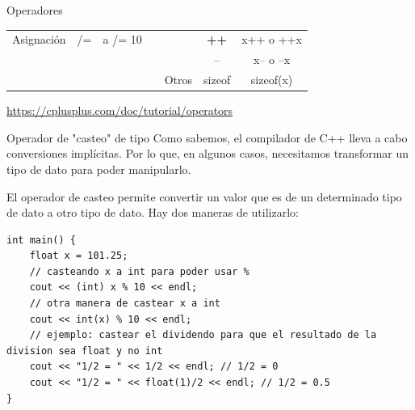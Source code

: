 \documentclass[12pt]{beamer}
\begin{document}
\begin{frame}{Operadores}
\begin{table}[]
\begin{tabular}{lccl|l|c|c|}
            \multicolumn{1}{|l|}{\multirow{-5}{*}{Asignación}} & \multicolumn{1}{c|}{/=} & \multicolumn{1}{c|}{a /= 10} &  &  & \textbf{++} & x++ o ++x \\ \cline{1-3} \cline{6-7} 
            & \multicolumn{1}{l}{} & \multicolumn{1}{l}{} &  &  & -- & x-- o --x \\ \cline{6-7} 
            & \multicolumn{1}{l}{} & \multicolumn{1}{l}{} &  & \multirow{-3}{*}{Otros} & sizeof & sizeof(x) \\ \cline{5-7} 
        \end{tabular}
    \end{table}
    \centering\footnotesize\url{https://cplusplus.com/doc/tutorial/operators}
\end{frame}

\begin{frame}[fragile]{Operador de "casteo" de tipo}
    Como sabemos, el compilador de C++ lleva a cabo conversiones implícitas. Por lo que, en algunos casos, necesitamos transformar un tipo de dato para poder manipularlo. 

    \medskip

    El operador de casteo permite convertir un valor que es de un determinado tipo de dato a otro tipo de dato. Hay dos maneras de utilizarlo:
\begin{lstlisting}[basicstyle=\scriptsize]
int main() {
    float x = 101.25;
    // casteando x a int para poder usar %
    cout << (int) x % 10 << endl;
    // otra manera de castear x a int
    cout << int(x) % 10 << endl;
    // ejemplo: castear el dividendo para que el resultado de la division sea float y no int
    cout << "1/2 = " << 1/2 << endl; // 1/2 = 0
    cout << "1/2 = " << float(1)/2 << endl; // 1/2 = 0.5
}
\end{lstlisting}
\end{frame}
\end{document}
